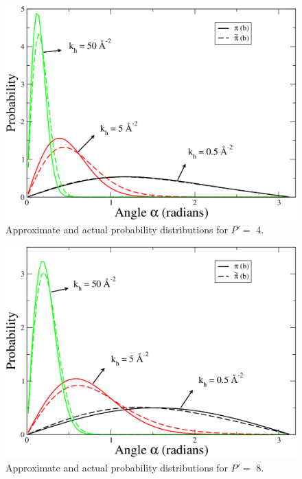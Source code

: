                 \begin{figure}[!htbp]
                    \centering
                    \includegraphics[scale=0.20,keepaspectratio]{Chapter-4/Figures/phi4B.png}
                    \caption{Approximate and actual probability distributions for $P' =$ 4.}
                    \label{fig:phi4B}
                \end{figure}

                \begin{figure}[!htbp]
                    \centering
                    \includegraphics[scale=0.20,keepaspectratio]{Chapter-4/Figures/phi8B.png}
                    \caption{Approximate and actual probability distributions for $P' =$ 8.}
                    \label{fig:phi8B}
                \end{figure}

